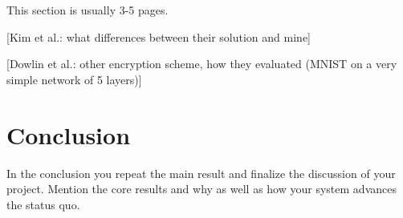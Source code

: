 \documentclass[a4paper,11pt,oneside]{report}
\begin{document}
This section is usually 3-5 pages.

[Kim et al.: what differences between their solution and mine]

[Dowlin et al.: other encryption scheme, how they evaluated (MNIST on a very simple network of 5 layers)]


\chapter{Conclusion}

In the conclusion you repeat the main result and finalize the discussion of
your project. Mention the core results and why as well as how your system
advances the status quo.

\cleardoublepage
{}
{}
\printbibliography
\end{document}
